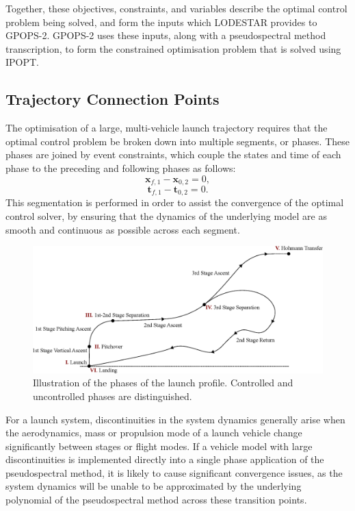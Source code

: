 Together, these objectives, constraints, and variables describe the optimal control problem being solved, and form the inputs which LODESTAR provides to GPOPS-2. GPOPS-2 uses these inputs, along with a pseudospectral method transcription, to form the constrained optimisation problem that is solved using IPOPT.









\subsection{Trajectory Connection Points}
The optimisation of a large, multi-vehicle launch trajectory requires that the optimal control problem be broken down into multiple segments, or phases\cite{Patterson2015}.
 These phases are joined by event constraints, which couple the states and time of each phase to the preceding and following phases as follows:
 \begin{equation}\label{eq:cont1}
 \textbf{x}_{f,1} - \textbf{x}_{0,2} = 0,
 \end{equation}
 \begin{equation}\label{eq:cont2}
 \textbf{t}_{f,1} - \textbf{t}_{0,2} = 0.
 \end{equation}
 This segmentation is performed in order to assist the convergence of the optimal control solver, by ensuring that the dynamics of the underlying model are as smooth and continuous as possible across each segment. 
  \begin{figure}[ht]
  	\centering
  	\includegraphics[width=1.\linewidth]{figures/4_LODESTAR/Traj}
  	\caption{Illustration of the phases of the launch profile. Controlled and uncontrolled phases are distinguished. }
  	\label{fig:Traj}
  \end{figure}
  
For a launch system, discontinuities in the system dynamics generally arise when the aerodynamics, mass or propulsion mode of a launch vehicle change significantly between stages or flight modes. 
If a vehicle model with large discontinuities is implemented directly into a single phase application of the pseudospectral method, it is likely to cause significant convergence issues, as the system dynamics will be unable to be approximated by the underlying polynomial of the pseudospectral method across these transition points\cite{Betts2009}.

